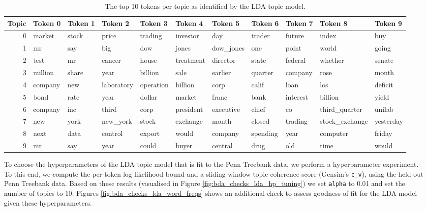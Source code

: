 \begin{table}[!htb]
    \centering
    \scriptsize
    \begin{tabular}{rllllllllll}
\toprule
 Topic &  Token 0 & Token 1 &     Token 2 &    Token 3 &    Token 4 &    Token 5 &   Token 6 &   Token 7 &         Token 8 &    Token 9 \\
\midrule
     0 &   market &   stock &       price &    trading &   investor &        day &    trader &    future &           index &        buy \\
     1 &       mr &     say &         big &        dow &      jones &  dow\_jones &       one &     point &           world &      going \\
     2 &     test &      mr &      cancer &      house &  treatment &   director &     state &   federal &         whether &     senate \\
     3 &  million &   share &        year &    billion &       sale &    earlier &   quarter &   company &            rose &      month \\
     4 &  company &     new &  laboratory &  operation &    billion &       corp &     calif &      loan &             los &    deficit \\
     5 &     bond &    rate &        year &     dollar &     market &      franc &      bank &  interest &         billion &      yield \\
     6 &  company &     inc &       third &       corp &  president &  executive &     chief &        co &   third\_quarter &     unilab \\
     7 &      new &    york &    new\_york &      stock &   exchange &      month &    closed &   trading &  stock\_exchange &  yesterday \\
     8 &     next &    data &     control &     export &      would &    company &  spending &      year &        computer &     friday \\
     9 &       mr &     say &        year &      could &      buyer &    central &      drug &       old &            time &      would \\
\bottomrule
\end{tabular}
    \caption{The top 10 tokens per topic as identified by the LDA topic model.}
    \label{tab:lda_topic_words}
\end{table}


To choose the hyperparameters of the LDA topic model that is fit to the Penn Treebank data, we perform a hyperparameter experiment. To this end, we compute the per-token log likelihood bound and a sliding window topic coherence score (Gensim's \texttt{c\_v}), using the held-out Penn Treebank data. Based on these results (visualised in Figure \ref{fig:bda_checks_lda_hp_tuning}) we set \texttt{alpha} to 0.01 and set the number of topics to 10. Figures \ref{fig:bda_checks_lda_word_freqs} shows an additional check to assess goodness of fit for the LDA model given these hyperparameters. %




